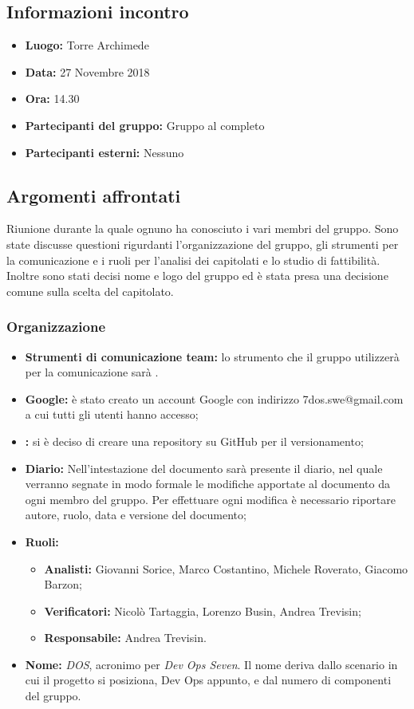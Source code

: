 \subsection{Informazioni incontro}
\begin{itemize}
	\item { \textbf{Luogo:} Torre Archimede  }
	\item { \textbf{Data:} 27 Novembre 2018 }
	\item { \textbf{Ora:} 14.30 }
	\item { \textbf{Partecipanti del gruppo:} Gruppo al completo }
	\item { \textbf{Partecipanti esterni:} Nessuno }
\end{itemize}


\subsection{Argomenti affrontati}
Riunione durante la quale ognuno ha conosciuto i vari membri del gruppo. Sono state discusse questioni rigurdanti l'organizzazione del gruppo, gli strumenti per la comunicazione e i ruoli per l'analisi dei capitolati e lo studio di fattibilità. Inoltre sono stati decisi nome e logo del gruppo ed è stata presa una decisione comune sulla scelta del capitolato.

\subsubsection{Organizzazione}
\begin{itemize}
	\item { \textbf{Strumenti di comunicazione team:} lo strumento che il gruppo utilizzerà per la comunicazione sarà \textit{}.}
	\item{ \textbf{Google:} è stato creato un account Google con indirizzo 7dos.swe@gmail.com a cui tutti gli utenti hanno accesso;}
	\item { \textbf{:} si è deciso di creare una repository su GitHub per il versionamento;}
	\item { \textbf{Diario:} Nell'intestazione del documento sarà presente il diario, nel quale verranno segnate in modo formale le modifiche apportate al documento da ogni membro del gruppo.
		Per effettuare ogni modifica è necessario riportare autore, ruolo, data e versione del documento;}
	\item { \textbf{Ruoli:}  }
	\begin{itemize}
		\item { \textbf{Analisti:} Giovanni Sorice, Marco Costantino, Michele Roverato, Giacomo Barzon;}
		\item { \textbf{Verificatori:} Nicolò Tartaggia, Lorenzo Busin, Andrea Trevisin;}
		\item { \textbf{Responsabile:} Andrea Trevisin.}
	\end{itemize}
	\item { \textbf{Nome:} \emph{DOS}, acronimo per \emph{Dev Ops Seven}. Il nome deriva dallo scenario in cui il progetto si posiziona, Dev Ops appunto, e dal numero di componenti del gruppo.}
\end{itemize}

